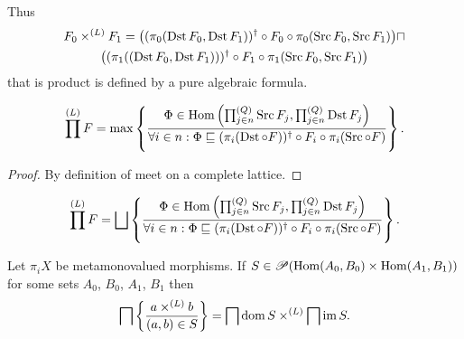 \begin{rem}
  Thus
  \begin{multline*}
    F_0 \times^{(L)} F_1 = \bigl((\pi_0(\operatorname{Dst} F_0 , \operatorname{Dst}
    F_1))^{\dagger} \circ F_0 \circ \pi_0(\operatorname{Src} F_0 , \operatorname{Src}
    F_1)\bigr) \sqcap\\ \bigl((\pi_1((\operatorname{Dst} F_0 , \operatorname{Dst} F_1)))^{\dagger}
    \circ F_1 \circ \pi_1(\operatorname{Src} F_0 , \operatorname{Src} F_1)\bigr)
  \end{multline*}
  that is product is defined by a pure algebraic formula.
\end{rem}

\begin{prop}
  \[ \prod^{(L)} F = \max \left\{ \frac{ \Phi \in \operatorname{Hom} \left( \prod^{(Q)}_{j \in
  n} \operatorname{Src} F_j , \prod^{(Q)}_{j \in n} \operatorname{Dst} F_j \right)
  }{ \forall i \in n : \Phi \sqsubseteq (\pi_i(\operatorname{Dst}\circ F))^{\dagger} \circ F_i \circ \pi_i(\operatorname{Src}\circ F) }\right\}. \]
\end{prop}

\begin{proof}
  By definition of meet on a complete lattice.
\end{proof}

\begin{cor}
  \[ \prod^{(L)} F = \bigsqcup \setcond{ \Phi \in \Hom \left( \prod^{(Q)}_{j
  \in n} \Src F_j , \prod^{(Q)}_{j \in n} \Dst F_j \right)
  }{ \forall i \in n : \Phi \sqsubseteq (\pi_i(\Dst\circ F))^{\dagger} \circ F_i \circ \pi_i(\Src\circ F) }. \]
\end{cor}

\begin{thm}
  Let $\pi_i X$ be metamonovalued morphisms. If $S \in \mathscr{P} (\operatorname{Hom}
  (A_0 , B_0) \times \operatorname{Hom} (A_1 , B_1))$ for some sets $A_0$, $B_0$,
  $A_1$, $B_1$ then
  \[ \bigsqcap \left\{ \frac{ a \times^{(L)} b }{(a , b)\in S }\right\} =
     \bigsqcap \operatorname{dom} S \times^{(L)} \bigsqcap \operatorname{im} S. \]
\end{thm}

